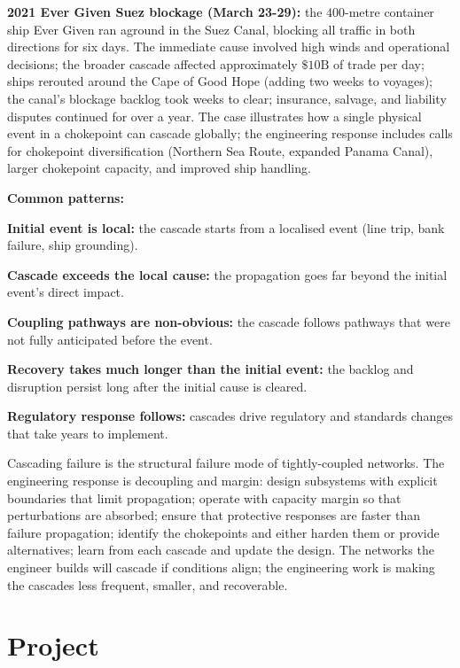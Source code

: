 \textbf{2021 Ever Given Suez blockage (March 23-29):} the $400$-metre container ship Ever Given ran aground in the Suez Canal, blocking all traffic in both directions for six days. The immediate cause involved high winds and operational decisions; the broader cascade affected approximately $\$10\text{B}$ of trade per day; ships rerouted around the Cape of Good Hope (adding two weeks to voyages); the canal's blockage backlog took weeks to clear; insurance, salvage, and liability disputes continued for over a year. The case illustrates how a single physical event in a chokepoint can cascade globally; the engineering response includes calls for chokepoint diversification (Northern Sea Route, expanded Panama Canal), larger chokepoint capacity, and improved ship handling.

\textbf{Common patterns:}

\textbf{Initial event is local:} the cascade starts from a localised event (line trip, bank failure, ship grounding).

\textbf{Cascade exceeds the local cause:} the propagation goes far beyond the initial event's direct impact.

\textbf{Coupling pathways are non-obvious:} the cascade follows pathways that were not fully anticipated before the event.

\textbf{Recovery takes much longer than the initial event:} the backlog and disruption persist long after the initial cause is cleared.

\textbf{Regulatory response follows:} cascades drive regulatory and standards changes that take years to implement.

\begin{principle}
Cascading failure is the structural failure mode of tightly-coupled networks. The engineering response is decoupling and margin: design subsystems with explicit boundaries that limit propagation; operate with capacity margin so that perturbations are absorbed; ensure that protective responses are faster than failure propagation; identify the chokepoints and either harden them or provide alternatives; learn from each cascade and update the design. The networks the engineer builds will cascade if conditions align; the engineering work is making the cascades less frequent, smaller, and recoverable.
\end{principle}

\section{Project}

